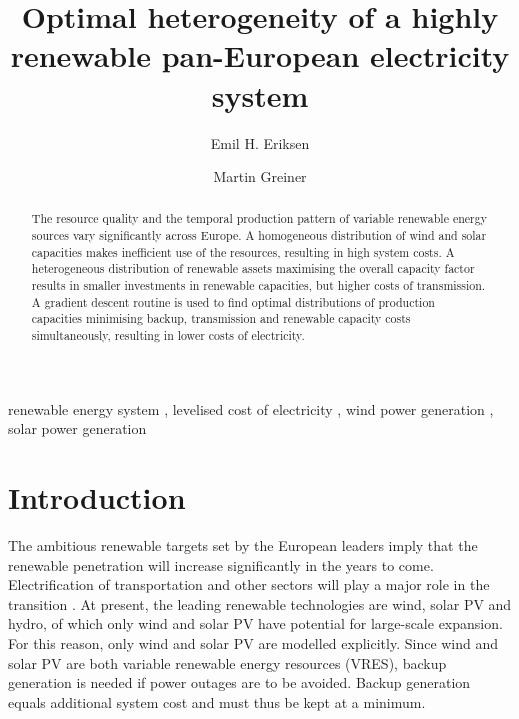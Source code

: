\documentclass[a4paper, 5p, sort&compress]{elsarticle}%
\begin{document}
\begin{frontmatter}

\title{Optimal heterogeneity of a highly renewable pan-European electricity system}

\author[label1]{Emil H. Eriksen}
\author[label2,label3]{Martin Greiner}
\address[label1]{Department of Physics and Astronomy, Aarhus University, 8000 Aarhus C,  Denmark}
\address[label2]{Department of Mathematics, Aarhus University, 8000 Aarhus C,  Denmark}
\address[label3]{Department of Engineering, Aarhus University, 8200 Aarhus,  Denmark}


\begin{abstract}
  The resource quality and the temporal production pattern of variable
  renewable energy sources vary significantly across Europe. A
  homogeneous distribution of wind and solar capacities makes
  inefficient use of the resources, resulting in high system costs. A
  heterogeneous distribution of renewable assets maximising the
  overall capacity factor results in smaller investments in renewable
  capacities, but higher costs of transmission. A gradient descent
  routine is used to find optimal distributions of production
  capacities minimising backup, transmission and renewable capacity
  costs simultaneously, resulting in lower costs of electricity.
\end{abstract}

\begin{keyword}
renewable energy system \sep 
levelised cost of electricity \sep
wind power generation \sep
solar power generation 
\end{keyword}

\end{frontmatter}


\section{Introduction}
\label{sec:one}

The ambitious renewable targets set by the European leaders
\cite{eu2050} imply that the renewable penetration will increase
significantly in the years to come. Electrification of transportation
and other sectors will play a major role in the transition
\cite{Williams12,ecf2050}. At present, the leading renewable
technologies are wind, solar PV and hydro, of which only wind and
solar PV have potential for large-scale expansion. For this reason,
only wind and solar PV are modelled explicitly. Since wind and
solar PV are both variable renewable energy resources (VRES), backup
generation is needed if power outages are to be avoided. Backup
generation equals additional system cost and must thus be kept at a
minimum.
\end{document}
